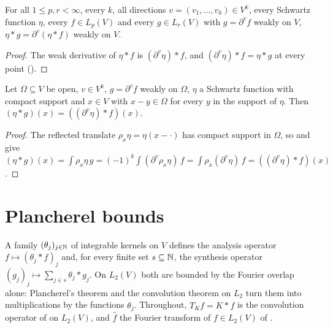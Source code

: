\begin{lemma}
\label{lem:weak-derivative-convolution-lp}
\leanok
{}
For all $1 \leq p, r < \infty$, every $k$, all directions $v = (v_1, \dots, v_k) \in V^k$, every
Schwartz function $\eta$, every $f \in L_p(V)$ and every $g \in L_r(V)$ with $g = \partial^v f$
weakly on $V$, $\eta * g = \partial^v (\eta * f)$ weakly on $V$.
\end{lemma}

\begin{proof}
\leanok
The weak derivative of $\eta * f$ is $(\partial^v \eta) * f$, and $(\partial^v \eta) * f =
\eta * g$ at every point ().
\end{proof}

\begin{lemma}
\label{lem:weak-derivative-convolution-local}
\leanok
{}
Let $\Omega \subseteq V$ be open, $v \in V^k$, $g = \partial^v f$ weakly on $\Omega$, $\eta$ a
Schwartz function with compact support and $x \in V$ with $x - y \in \Omega$ for every $y$ in the
support of $\eta$. Then $(\eta * g)(x) = ((\partial^v \eta) * f)(x)$.
\end{lemma}

\begin{proof}
\leanok
The reflected translate $\rho_x \eta = \eta(x - \cdot)$ has compact support in $\Omega$, so
 and  give
$(\eta * g)(x) = \int \rho_x \eta \, g = (-1)^k \int (\partial^v \rho_x \eta) \, f
= \int \rho_x(\partial^v \eta) \, f = ((\partial^v \eta) * f)(x)$.
\end{proof}

\section{Plancherel bounds}
\label{sec:plancherel-bounds}

A family $(\theta_j)_{j \in \mathbb{N}}$ of integrable kernels on $V$ defines the analysis operator
$f \mapsto (\theta_j * f)_j$ and, for every finite set $s \subseteq \mathbb{N}$, the synthesis operator
$(g_j)_j \mapsto \sum_{j \in s} \theta_j * g_j$. On $L_2(V)$ both are bounded by the Fourier
overlap alone: Plancherel's theorem and the convolution theorem on $L_2$ turn them into
multiplications by the functions $\widehat{\theta_j}$. Throughout, $T_K f = K * f$ is the
convolution operator of  on $L_2(V)$, and $\widehat f$ the Fourier transform
of $f \in L_2(V)$ of .

